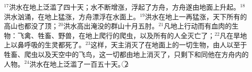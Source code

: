 $^{17}$洪水在地上泛滥了四十天；水不断增涨，浮起了方舟，方舟遂由地面上升起。$^{18}$洪水汹涌，在地上猛涨，方舟漂浮在水面上。$^{19}$洪水在地上一再猛涨，天下所有的高山也都没了顶；$^{20}$洪水高出淹没的群山十月五肘。$^{21}$凡地上行动而有血肉的生物：飞禽、牲畜、野兽，在地上爬行的爬虫，以及所有的人全灭亡了；$^{22}$凡在旱地上以鼻呼吸的生灵都死了。$^{23}$这样，天主消灭了在地面上的一切生物，由人以至于牲畜、爬虫以及天空中的飞鸟，这一切都由地上消灭了，只剩下\UL[诺厄]和同他在方舟内的人物。$^{24}$洪水在地上泛滥了一百五十天。\textcircled{2}


